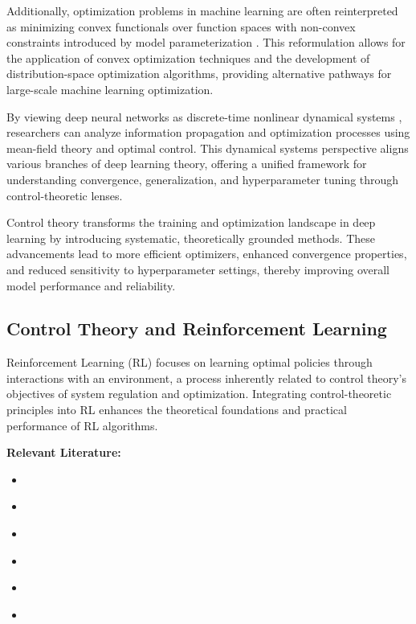 \documentclass{article}
\theoremstyle{plain}
\theoremstyle{definition}
\theoremstyle{remark}
\begin{document}
Additionally, optimization problems in machine learning are often reinterpreted as minimizing convex functionals over function spaces with non-convex constraints introduced by model parameterization \cite{caiOptimizationMachineLearning2020}. This reformulation allows for the application of convex optimization techniques and the development of distribution-space optimization algorithms, providing alternative pathways for large-scale machine learning optimization.

By viewing deep neural networks as discrete-time nonlinear dynamical systems \cite{liuDeepLearningTheory2019}, researchers can analyze information propagation and optimization processes using mean-field theory and optimal control. This dynamical systems perspective aligns various branches of deep learning theory, offering a unified framework for understanding convergence, generalization, and hyperparameter tuning through control-theoretic lenses.

Control theory transforms the training and optimization landscape in deep learning by introducing systematic, theoretically grounded methods. These advancements lead to more efficient optimizers, enhanced convergence properties, and reduced sensitivity to hyperparameter settings, thereby improving overall model performance and reliability.

\subsection{Control Theory and Reinforcement Learning}

Reinforcement Learning (RL) focuses on learning optimal policies through interactions with an environment, a process inherently related to control theory's objectives of system regulation and optimization. Integrating control-theoretic principles into RL enhances the theoretical foundations and practical performance of RL algorithms.

\textbf{Relevant Literature:}
\begin{itemize}
    \item \cite{chenGeneralControltheoreticApproach2024}
    \item \cite{bonassiRecurrentNeuralNetworks2022}
    \item \cite{bonassiReconcilingDeepLearning2024}
    \item \cite{charPIDinspiredInductiveBiases}
    \item \cite{feiRealtimeProgressiveLearning2023}
    \item \cite{chenAsymptoticallyFairParticipation2023}
\end{itemize}
\end{document}
